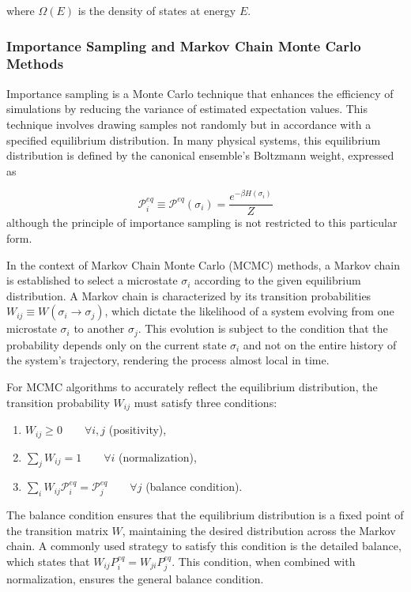 where $\Omega(E)$ is the density of states at energy $E$.

\subsubsection{Importance Sampling and Markov Chain Monte Carlo Methods}

Importance sampling is a Monte Carlo technique that enhances the efficiency of
simulations by reducing the variance of estimated expectation values. This
technique involves drawing samples not randomly but in accordance with a
specified equilibrium distribution. In many physical systems, this equilibrium
distribution is defined by the canonical ensemble's Boltzmann weight, expressed
as 

\begin{equation}
    \mathcal{P}^{eq}_i \equiv \mathcal{P}^{eq}(\sigma_i) = \frac{e^{-\beta H(\sigma_i)}}{Z}
\end{equation}
although the principle of importance sampling is not restricted to this
particular form.

In the context of Markov Chain Monte Carlo (MCMC) methods, a Markov chain is
established to select a microstate \( \sigma_i \) according to the given
equilibrium distribution. A Markov chain is characterized by its transition
probabilities \( W_{ij} \equiv W(\sigma_i \rightarrow \sigma_j) \), which
dictate the likelihood of a system evolving from one microstate \( \sigma_i \)
to another \( \sigma_j \). This evolution is subject to the condition that the
probability depends only on the current state \( \sigma_i \) and not on the
entire history of the system's trajectory, rendering the process almost local in
time.

For MCMC algorithms to accurately reflect the equilibrium distribution, the
transition probability \( W_{ij} \) must satisfy three conditions:

\begin{enumerate}
    \item \( W_{ij} \geq 0 \qquad \forall i, j \) (positivity),
    \item \( \sum_j W_{ij} = 1  \qquad \forall i \) (normalization),
    \item \( \sum_i W_{ij} \mathcal{P}^{eq}_i = \mathcal{P}^{eq}_j \qquad
    \forall j \) (balance condition).
\end{enumerate}

The balance condition ensures that the equilibrium distribution is a fixed point
of the transition matrix \( W \), maintaining the desired distribution across
the Markov chain. A commonly used strategy to satisfy this condition is the
detailed balance, which states that \( W_{ij} P^{eq}_i = W_{ji} P^{eq}_j \).
This condition, when combined with normalization, ensures the general balance
condition.

